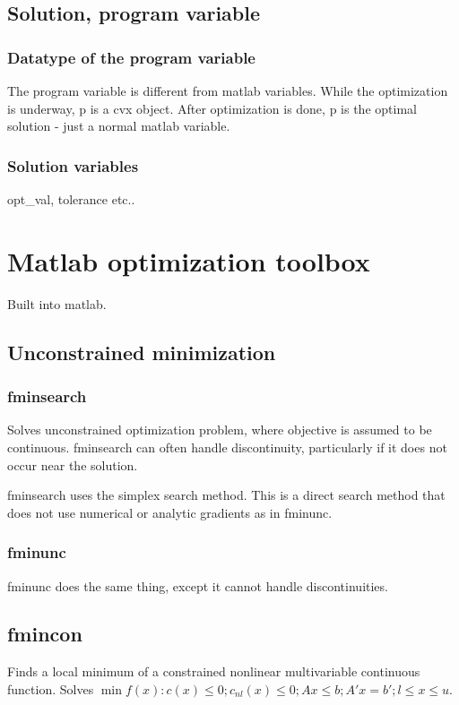 \documentclass[oneside, article]{memoir}
\begin{document}
\subsection{Solution, program variable}
\subsubsection{Datatype of the program variable}
The program variable is different from matlab variables. While the optimization is underway, p is a cvx object. After optimization is done, p is the optimal solution - just a normal matlab variable.

\subsubsection{Solution variables}
opt\_val, tolerance etc..


\section{Matlab optimization toolbox}
Built into matlab.

\subsection{Unconstrained minimization}
\subsubsection{fminsearch}
Solves unconstrained optimization problem, where objective is assumed to be continuous. fminsearch can often handle discontinuity, particularly if it does not occur near the solution.

fminsearch uses the simplex search method. This is a direct search method that does not use numerical or analytic gradients as in fminunc.

\subsubsection{fminunc}
fminunc does the same thing, except it cannot handle discontinuities. \chk

\subsection{fmincon}
Finds a local minimum of a constrained nonlinear multivariable continuous function. Solves $\min f(x): c(x) \leq 0; c_{nl}(x) \leq 0; Ax \leq b; A'x = b'; l \leq x \leq u$.
\end{document}
